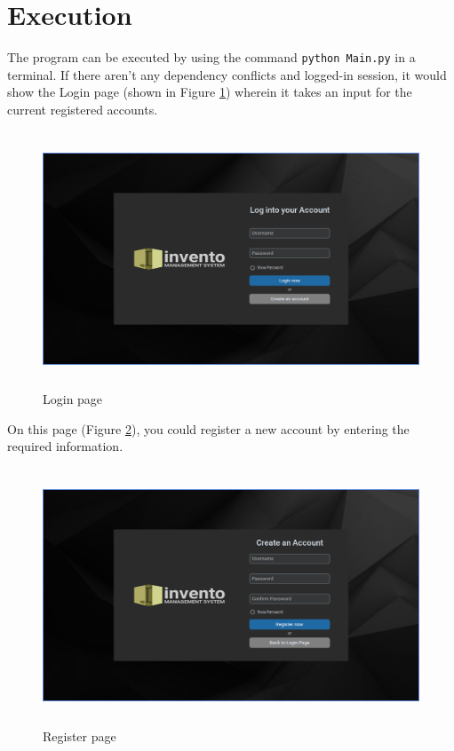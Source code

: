 \documentclass[12pt,a4paper]{article}
\begin{document}
\newpage
\section*{Execution}

\hspace\parindent The program can be executed by using the command \texttt{python Main.py} in a terminal. If there aren't any dependency conflicts and logged-in session, it would show the Login page (shown in Figure \ref{fig:login}) wherein it takes an input for the current registered accounts.

\hfill{}

\begin{figure}[ht]
  \centering
  \includegraphics[width=5in,height=3in]{Login.png}
  \caption{Login page}
  \label{fig:login}
\end{figure}

\hspace\parindent
On this page (Figure \ref{fig:register}), you could register a new account by entering the required information.

\hfill{}

\begin{figure}[ht]
  \centering
  \includegraphics[width=5in,height=3in]{Register.png}
  \caption{Register page}
  \label{fig:register}
\end{figure}
\end{document}
